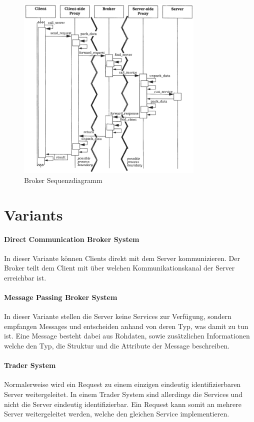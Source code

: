 \begin{figure}[H]
	\centering
	\includegraphics[width=0.8\textwidth]{figures/06-broker-2}
	\caption{Broker Sequenzdiagramm}
\end{figure}

\section{Variants}

\paragraph{Direct Communication Broker System}
In dieser Variante können Clients direkt mit dem Server kommunizieren. Der Broker teilt dem Client mit über welchen Kommunikationskanal der Server erreichbar ist.

\paragraph{Message Passing Broker System}
In dieser Variante stellen die Server keine Services zur Verfügung, sondern empfangen Messages und entscheiden anhand von deren Typ, was damit zu tun ist. Eine Message besteht dabei aus Rohdaten, sowie zusätzlichen Informationen welche den Typ, die Struktur und die Attribute der Message beschreiben.

\paragraph{Trader System}
Normalerweise wird ein Request zu einem einzigen eindeutig identifizierbaren Server weitergeleitet. In einem Trader System sind allerdings die Services und nicht die Server eindeutig identifizierbar. Ein Request kann somit an mehrere Server weitergeleitet werden, welche den gleichen Service implementieren.

